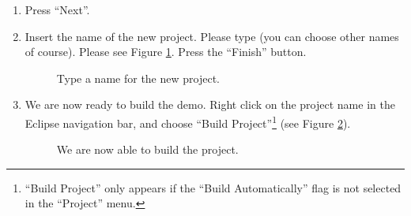 \begin{enumerate}
\item
  Press ``Next''.

\item
  Insert the name of the new project. Please type 
  (you can choose other names of course). Please see Figure
  \ref{fig:projectname}. Press the ``Finish'' button.
%
\begin{figure}[htb]
\caption{Type a name for the new project.}
\label{fig:projectname}
\end{figure}

\item
  We are now ready to build the demo. Right click on the project name
  in the Eclipse navigation bar, and choose ``Build
  Project''\footnote{``Build Project'' only appears if the ``Build
  Automatically'' flag is not selected in the ``Project'' menu.} (see
  Figure \ref{fig:build-project}).
%
\begin{figure}[htb]
\caption{We are now able to build the project.}
\label{fig:build-project}
\end{figure}


\end{enumerate}
